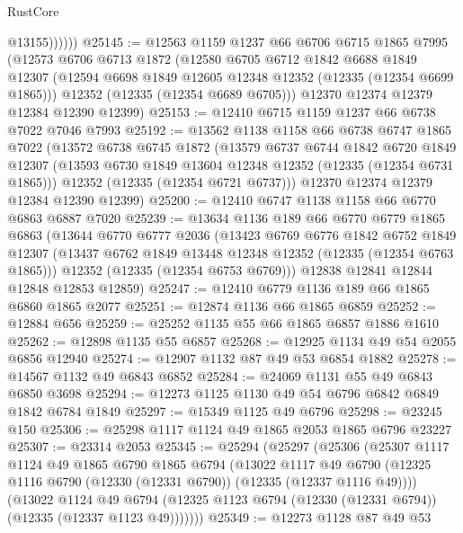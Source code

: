 \begin{lexlean}{RustCore}
\begin{coremodule}
                @13155))))))
@25145 := @12563
    @1159
    @1237
    @66
    @6706
    @6715
    @1865
    @7995
    (@12573
      @6706
      @6713
      @1872
      (@12580
        @6705
        @6712
        @1842
        @6688
        @1849
        @12307
        (@12594 @6698 @1849 @12605 @12348 @12352 (@12335 (@12354 @6699 @1865)))
        @12352
        (@12335 (@12354 @6689 @6705)))
      @12370
      @12374
      @12379
      @12384
      @12390
      @12399)
@25153 := @12410 @6715 @1159 @1237 @66 @6738 @7022 @7046 @7993
@25192 := @13562
    @1138
    @1158
    @66
    @6738
    @6747
    @1865
    @7022
    (@13572
      @6738
      @6745
      @1872
      (@13579
        @6737
        @6744
        @1842
        @6720
        @1849
        @12307
        (@13593 @6730 @1849 @13604 @12348 @12352 (@12335 (@12354 @6731 @1865)))
        @12352
        (@12335 (@12354 @6721 @6737)))
      @12370
      @12374
      @12379
      @12384
      @12390
      @12399)
@25200 := @12410 @6747 @1138 @1158 @66 @6770 @6863 @6887 @7020
@25239 := @13634
    @1136
    @189
    @66
    @6770
    @6779
    @1865
    @6863
    (@13644
      @6770
      @6777
      @2036
      (@13423
        @6769
        @6776
        @1842
        @6752
        @1849
        @12307
        (@13437 @6762 @1849 @13448 @12348 @12352 (@12335 (@12354 @6763 @1865)))
        @12352
        (@12335 (@12354 @6753 @6769)))
      @12838
      @12841
      @12844
      @12848
      @12853
      @12859)
@25247 := @12410 @6779 @1136 @189 @66 @1865 @6860 @1865 @2077
@25251 := @12874 @1136 @66 @1865 @6859
@25252 := @12884 @656
@25259 := @25252 @1135 @55 @66 @1865 @6857 @1886 @1610
@25262 := @12898 @1135 @55 @6857
@25268 := @12925 @1134 @49 @54 @2055 @6856 @12940
@25274 := @12907 @1132 @87 @49 @53 @6854 @1882
@25278 := @14567 @1132 @49 @6843 @6852
@25284 := @24069 @1131 @55 @49 @6843 @6850 @3698
@25294 := @12273 @1125 @1130 @49 @54 @6796 @6842 @6849 @1842 @6784 @1849
@25297 := @15349 @1125 @49 @6796
@25298 := @23245 @150
@25306 := @25298 @1117 @1124 @49 @1865 @2053 @1865 @6796 @23227
@25307 := @23314 @2053
@25345 := @25294
    (@25297
      (@25306
        (@25307
          @1117
          @1124
          @49
          @1865
          @6790
          @1865
          @6794
          (@13022
            @1117
            @49
            @6790
            (@12325 @1116 @6790 (@12330 (@12331 @6790)) (@12335 (@12337 @1116 @49))))
          (@13022
            @1124
            @49
            @6794
            (@12325 @1123 @6794 (@12330 (@12331 @6794)) (@12335 (@12337 @1123 @49)))))))
@25349 := @12273 @1128 @87 @49 @53

\end{coremodule}
\end{lexlean}
